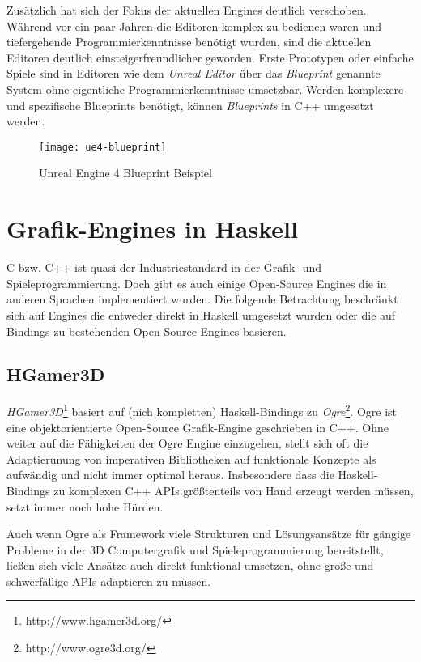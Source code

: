 Zusätzlich hat sich der Fokus der aktuellen Engines deutlich verschoben. Während vor ein paar Jahren die Editoren komplex zu bedienen waren und tiefergehende Programmierkenntnisse benötigt wurden, sind die aktuellen Editoren deutlich einsteigerfreundlicher geworden. Erste Prototypen oder einfache Spiele sind in Editoren wie dem \textit{Unreal Editor} über das \textit{Blueprint} genannte System ohne eigentliche Programmierkenntnisse umsetzbar. Werden komplexere und spezifische Blueprints benötigt, können \textit{Blueprints} in C++ umgesetzt werden.

\begin{figure}
\centering
\texttt{[image: ue4-blueprint]}
\caption{Unreal Engine 4 Blueprint Beispiel}
\end{figure}

\section{Grafik-Engines in Haskell}

C bzw. C++ ist quasi der Industriestandard in der Grafik- und Spieleprogrammierung. Doch gibt es auch einige Open-Source Engines die in anderen Sprachen implementiert wurden. Die folgende Betrachtung beschränkt sich auf Engines die entweder direkt in Haskell umgesetzt wurden oder die auf Bindings zu bestehenden Open-Source Engines basieren.

\subsection{HGamer3D}

\textit{HGamer3D}\footnote{http://www.hgamer3d.org/} basiert auf (nich kompletten) Haskell-Bindings zu \textit{Ogre}\footnote{http://www.ogre3d.org/}. Ogre ist eine objektorientierte Open-Source Grafik-Engine geschrieben in C++. Ohne weiter auf die Fähigkeiten der Ogre Engine einzugehen, stellt sich oft die Adaptierunung von imperativen Bibliotheken auf funktionale Konzepte als aufwändig und nicht immer optimal heraus. Insbesondere dass die Haskell-Bindings zu komplexen C++ \acsp{API} größtenteils von Hand erzeugt werden müssen, setzt immer noch hohe Hürden.

Auch wenn Ogre als Framework viele Strukturen und Lösungsansätze für gängige Probleme in der 3D Computergrafik und Spieleprogrammierung bereitstellt, ließen sich viele Ansätze auch direkt funktional umsetzen, ohne große und schwerfällige \acsp{API} adaptieren zu müssen.

